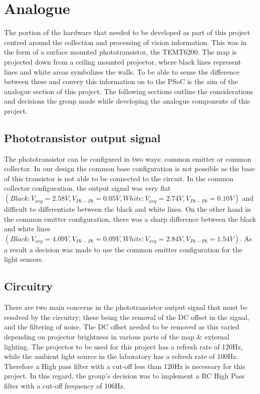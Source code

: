 \documentclass{article}
\begin{document}
\section{Analogue}

The portion of the hardware that needed to be developed as part of this project centred around the collection and processing of vision information. This was in the form of a surface mounted phototransistor, the TEMT6200. The map is projected down from a ceiling mounted projector, where black lines represent lines and white areas symbolizes the walls. To be able to sense the difference between these and convey this information on to the PSoC is the aim of the analogue section of this project. The following sections outline the considerations and decisions the group made while developing the analogue components of this project.

\subsection{Phototransistor output signal}

The phototransistor can be configured in two ways: common emitter or common collector. In our design the common base configuration is not possible as the base of this transistor is not able to be connected to the circuit. In the common collector configuration, the output signal was very flat $(Black: V_{avg} = 2.58V, V_{Pk-Pk} = 0.05V, White: V_{avg} = 2.74V, V_{Pk-Pk} = 0.10V)$ and difficult to differentiate between the black and white lines. On the other hand in the common emitter configuration, there was a sharp difference between the black and white lines $(Black: V_{avg} = 4.09V, V_{Pk-Pk} = 0.09V, White: V_{avg} = 2.84V, V_{Pk-Pk} = 1.54V)$. As a result a decision was made to use the common emitter configuration for the light sensors.

\subsection{Circuitry}

There are two main concerns in the phototransistor output signal that must be resolved by the circuitry; these being the removal of the DC offset in the signal, and the filtering of noise. The DC offset needed to be removed as this varied depending on projector brightness in various parts of the map \& external lighting. The projector to be used for this project has a refresh rate of 120Hz, while the ambient light source in the laboratory has a refresh rate of 100Hz. Therefore a High pass filter with a cut-off less than 120Hz is necessary for this project. In this regard, the group's decision was to implement a RC High Pass filter with a cut-off frequency of 106Hz.
\end{document}
